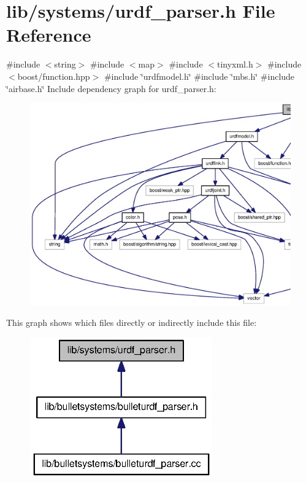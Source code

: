 \section{lib/systems/urdf\-\_\-parser.h \-File \-Reference}
\label{urdf__parser_8h}
{\ttfamily \#include $<$string$>$}\*
{\ttfamily \#include $<$map$>$}\*
{\ttfamily \#include $<$tinyxml.\-h$>$}\*
{\ttfamily \#include $<$boost/function.\-hpp$>$}\*
{\ttfamily \#include \char`\"{}urdfmodel.\-h\char`\"{}}\*
{\ttfamily \#include \char`\"{}mbs.\-h\char`\"{}}\*
{\ttfamily \#include \char`\"{}airbase.\-h\char`\"{}}\*
\-Include dependency graph for urdf\-\_\-parser.\-h\-:
\nopagebreak
\begin{figure}[H]
\begin{center}
\leavevmode
\includegraphics[width=350pt]{urdf__parser_8h__incl}
\end{center}
\end{figure}
\-This graph shows which files directly or indirectly include this file\-:
\nopagebreak
\begin{figure}[H]
\begin{center}
\leavevmode
\includegraphics[width=222pt]{urdf__parser_8h__dep__incl}
\end{center}
\end{figure}

